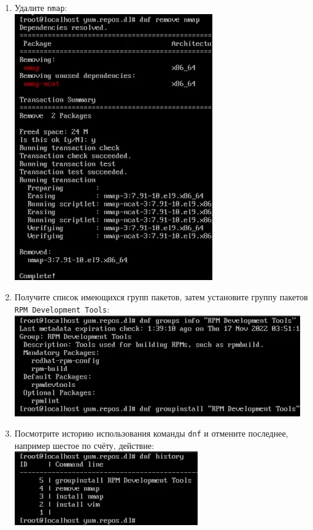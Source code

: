 \documentclass[12pt]{article}
\begin{document}
\begin{enumerate}
	\item Удалите \texttt{nmap}:
	      \\\includegraphics{4.png}
	\item Получите список имеющихся групп пакетов, затем установите группу пакетов \texttt{RPM Development Tools}:
	      \\\includegraphics{5.png}
	\item Посмотрите историю использования команды \texttt{dnf} и отмените последнее, например шестое по счёту, действие:
	      \\\includegraphics{6.png}

\end{enumerate}
\end{document}
